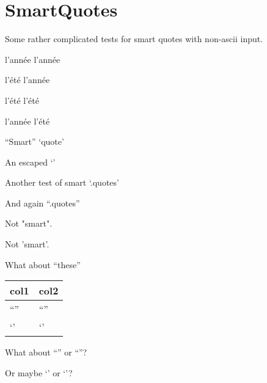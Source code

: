 
\def\mytitle{SmartQuotes Test}


\part{SmartQuotes}
\label{smartquotes}

Some rather complicated tests for smart quotes with non-ascii input.

l'année l'année

l'été l'année

l'été l'été

l'année l'été

``Smart'' `quote'

An escaped `\textbar{}'

Another test of smart `.quotes'

And again ``.quotes''

Not "smart".

Not 'smart'.

What about ``these''

\begin{table}[htbp]
\begin{minipage}{\linewidth}
\setlength{\tymax}{0.5\linewidth}
\centering
\small
\begin{tabulary}{\textwidth}{@{}LL@{}} \toprule
col1&col2\\
\midrule
``''&``''\\
`'&`'\\

\bottomrule

\end{tabulary}
\end{minipage}
\end{table}

What about ``'' or ``''?

Or maybe `' or `'?




